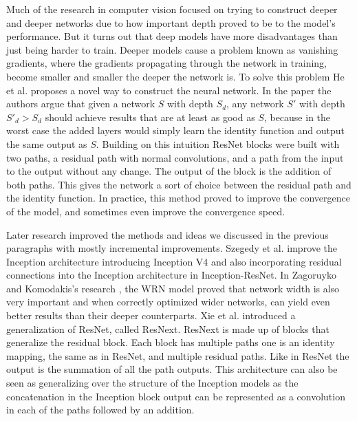 \documentclass[../main.tex]{subfiles}
\begin{document}
Much of the research in computer vision focused on trying to construct deeper and deeper networks due to how important depth proved to be to the model's performance.
But it turns out that deep models have more disadvantages than just being harder to train. Deeper models cause a problem known as vanishing gradients,
where the gradients propagating through the network in training, become smaller and smaller the deeper the network is.
To solve this problem He et al. \cite{resnet} proposes a novel way to construct the neural network. 
In the paper the authors argue that given a network $S$ with depth $S_d$, any network $S'$ with depth $S'_d > S_d$ should achieve results that are at least as 
good as $S$, because in the worst case the added layers would simply learn the identity function and output the same output as $S$.
Building on this intuition ResNet blocks were built with two paths, a residual path with normal convolutions, and a path from the input to the output without any change.
The output of the block is the addition of both paths. This gives the network a sort of choice between the residual path and the identity function.
In practice, this method proved to improve the convergence of the model, and sometimes even improve the convergence speed.
\par

Later research improved the methods and ideas we discussed in the previous paragraphs with mostly incremental improvements.
Szegedy et al. \cite{inceptionv4} improve the Inception architecture introducing Inception V4
and also incorporating residual connections into the Inception architecture in Inception-ResNet.
In Zagoruyko and Komodakis's research \cite{wideresnet}, the WRN model proved that network width is also very important and when correctly optimized
wider networks, can yield even better results than their deeper counterparts.
Xie et al. \cite{resnext} introduced a generalization of ResNet, called ResNext.
ResNext is made up of blocks that generalize the residual block. Each block has multiple paths one is an identity mapping,
the same as in ResNet, and multiple residual paths. Like in ResNet the output is the summation of all the path outputs.
This architecture can also be seen as generalizing over the structure of the Inception models as the concatenation in the Inception block output
can be represented as a convolution in each of the paths followed by an addition.
\par
\end{document}
